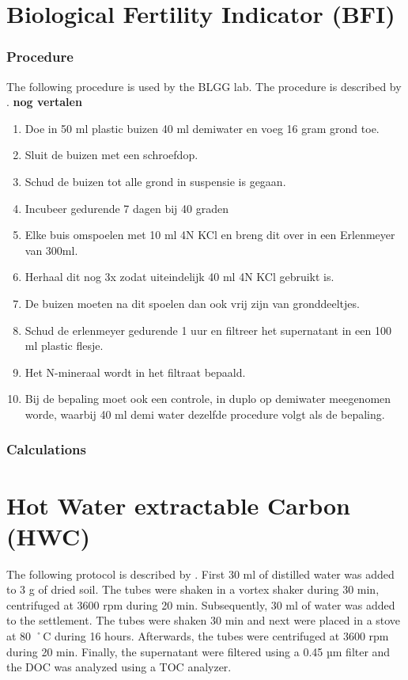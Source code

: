 \documentclass[10pt,twoside,dutch,english]{report}
\begin{document}
\begin{appendices}
\section{Biological Fertility Indicator (BFI)}
\subsubsection{Procedure}
The following procedure is used by the BLGG lab. The procedure is described by \citet{Hanegraaf2008}. \textbf{nog vertalen}

\begin{enumerate}
\item  Doe in 50 ml plastic buizen 40 ml demiwater en voeg 16 gram grond toe. 
\item  Sluit de buizen met een schroefdop.
\item Schud de buizen tot alle grond in suspensie is gegaan.
\item Incubeer gedurende 7 dagen bij 40 graden
\item Elke buis omspoelen met 10 ml 4N KCl en breng dit over in een Erlenmeyer van 300ml.
\item Herhaal dit nog 3x zodat uiteindelijk 40 ml 4N KCl gebruikt is. 
\item De buizen moeten na dit spoelen dan ook vrij zijn van gronddeeltjes.
\item Schud de erlenmeyer gedurende 1 uur en filtreer het supernatant in een 100 ml plastic flesje.
\item Het N-mineraal wordt in het filtraat bepaald.  
\item Bij de bepaling moet ook een controle, in duplo op demiwater meegenomen worde, waarbij 40 ml demi water dezelfde procedure volgt als de bepaling.
\end{enumerate}

\subsubsection{Calculations}

\section{Hot Water extractable Carbon (HWC)}
The following protocol is described by \citet{Ghani2003}. First 30 ml of distilled water was added to  3 g of dried soil. The tubes were shaken in a vortex shaker during 30 min, centrifuged at 3600 rpm during 20 min. Subsequently, 30 ml of water was added to the settlement. The tubes were shaken 30 min and next were placed in a stove at 80 ˚C during 16 hours. Afterwards, the tubes were centrifuged at 3600 rpm during 20 min. Finally, the supernatant were filtered using a 0.45 µm filter and the DOC was analyzed using a TOC analyzer. 

\end{appendices}
\end{document}
